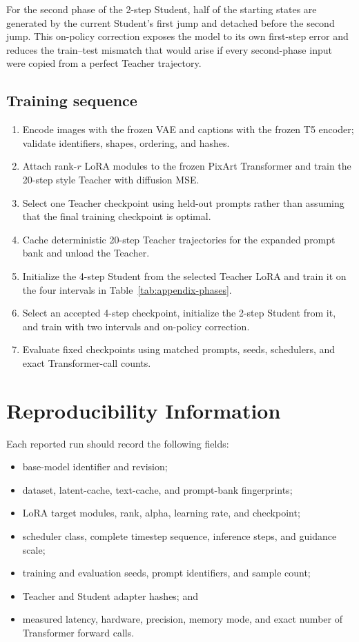 \documentclass{article}
\begin{document}
For the second phase of the 2-step Student, half of the starting states are
generated by the current Student's first jump and detached before the second
jump. This on-policy correction exposes the model to its own first-step error
and reduces the train--test mismatch that would arise if every second-phase
input were copied from a perfect Teacher trajectory.

\subsection{Training sequence}

\begin{enumerate}
    \item Encode images with the frozen VAE and captions with the frozen T5
    encoder; validate identifiers, shapes, ordering, and hashes.
    \item Attach rank-$r$ LoRA modules to the frozen PixArt Transformer and
    train the 20-step style Teacher with diffusion MSE.
    \item Select one Teacher checkpoint using held-out prompts rather than
    assuming that the final training checkpoint is optimal.
    \item Cache deterministic 20-step Teacher trajectories for the expanded
    prompt bank and unload the Teacher.
    \item Initialize the 4-step Student from the selected Teacher LoRA and train
    it on the four intervals in Table~\ref{tab:appendix-phases}.
    \item Select an accepted 4-step checkpoint, initialize the 2-step Student
    from it, and train with two intervals and on-policy correction.
    \item Evaluate fixed checkpoints using matched prompts, seeds, schedulers,
    and exact Transformer-call counts.
\end{enumerate}

\section{Reproducibility Information}
\label{app:reproducibility}

Each reported run should record the following fields:
\begin{itemize}
    \item base-model identifier and revision;
    \item dataset, latent-cache, text-cache, and prompt-bank fingerprints;
    \item LoRA target modules, rank, alpha, learning rate, and checkpoint;
    \item scheduler class, complete timestep sequence, inference steps, and
    guidance scale;
    \item training and evaluation seeds, prompt identifiers, and sample count;
    \item Teacher and Student adapter hashes; and
    \item measured latency, hardware, precision, memory mode, and exact number
    of Transformer forward calls.
\end{itemize}
\end{document}
